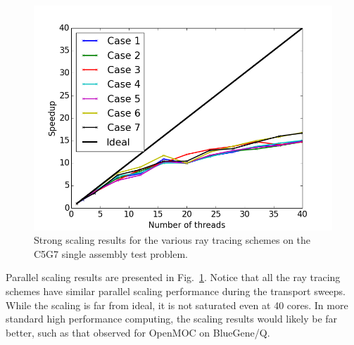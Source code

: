 \begin{figure}[ht!]
	\centering
	\includegraphics[width=0.75\linewidth]{figures/ph2016/scaling.png}
	\caption{Strong scaling results for the various ray tracing schemes on the C5G7 single assembly test problem.}
	\label{fig::scaling}
\end{figure}

Parallel scaling results are presented in Fig.~\ref{fig::scaling}. Notice that all the ray tracing schemes have similar parallel scaling performance during the transport sweeps. While the scaling is far from ideal, it is not saturated even at 40 cores. In more standard high performance computing, the scaling results would likely be far better, such as that observed for OpenMOC on BlueGene/Q\cite{will}.







